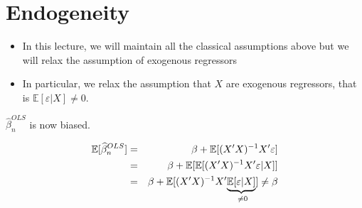 \documentclass[notes=show]{beamer}
\begin{document}
\section{Endogeneity}

\begin{frame}%


\begin{itemize}
\item In this lecture, we will maintain all the classical assumptions above
but we will relax the assumption of exogenous regressors

\item In particular, we relax the assumption that $X$ are exogenous
regressors, that is $\mathbb{E}[\varepsilon |X]\neq 0.$
\end{itemize}

\end{frame}%

\begin{frame}%


$\widehat{\beta }_{n}^{OLS}$ is now biased.

\begin{eqnarray*}
\mathbb{E}[\widehat{\beta }_{n}^{OLS}] &=&\beta +\mathbb{E}[(X^{\prime
}X)^{-1}X^{\prime }\varepsilon ] \\
&=&\beta +\mathbb{E[E[}(X^{\prime }X)^{-1}X^{\prime }\varepsilon |X]] \\
&=&\beta +\mathbb{E[}(X^{\prime }X)^{-1}X^{\prime }\underset{\neq 0}{%
\underbrace{\mathbb{E[}\varepsilon |X]}]}\neq \beta
\end{eqnarray*}

\end{frame}%
\end{document}
